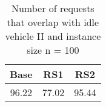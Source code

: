 \begin{table}[H]
\centering
\begin{tabular}{ccc}
  \hline
  \textbf{Base} & \textbf{RS1} & \textbf{RS2} \\\hline
  96.22 & 77.02 & 95.44 \\\hline
\end{tabular}
\caption{Number of requests that overlap with idle vehicle II and instance size n = 100}
\label{tab:wait:resrelocation-number-request-overlap-comparison_II_100}
\end{table}
